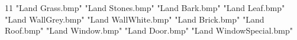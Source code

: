 11
"Land Grass.bmp"
"Land Stones.bmp"
"Land Bark.bmp"
"Land Leaf.bmp"
"Land WallGrey.bmp"
"Land WallWhite.bmp"
"Land Brick.bmp"
"Land Roof.bmp"
"Land Window.bmp"
"Land Door.bmp"
"Land WindowSpecial.bmp"